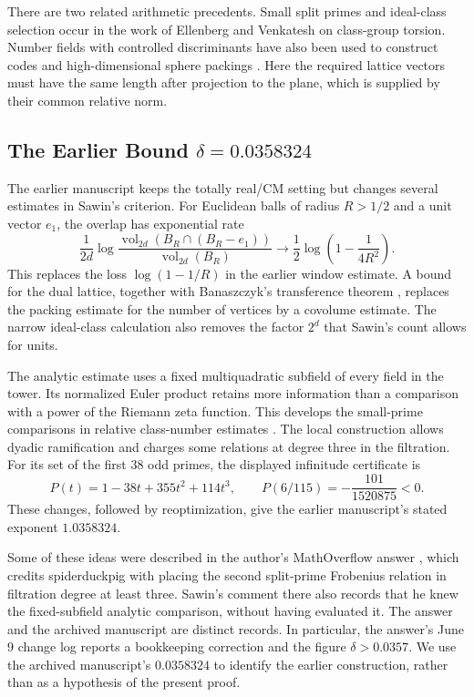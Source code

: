 There are two related arithmetic precedents. Small split primes and
ideal-class selection occur in the work of Ellenberg and Venkatesh
\cite{EllenbergVenkatesh2007} on class-group torsion. Number fields
with controlled discriminants have also been used to construct codes
and high-dimensional sphere packings
\cite{Lenstra1986,LitsynTsfasman1987}. Here the required lattice
vectors must have the same length after projection to the plane,
which is supplied by their common relative norm.

\subsection{The Earlier Bound $\delta=0.0358324$}

The earlier manuscript \cite{NaslundLegacy2026} keeps the totally
real/CM setting but changes several estimates in Sawin's criterion.
For Euclidean balls of radius $R>1/2$ and a unit vector $e_1$, the
overlap has exponential rate
\[
 \frac{1}{2d}\log
 \frac{\operatorname{vol}_{2d}(B_R\cap(B_R-e_1))}
      {\operatorname{vol}_{2d}(B_R)}
 \longrightarrow \frac12\log\left(1-\frac1{4R^2}\right).
\]
This replaces the loss $\log(1-1/R)$ in the earlier window estimate.
A bound for the dual lattice, together with Banaszczyk's transference
theorem \cite{Banaszczyk1993}, replaces the packing estimate for the
number of vertices by a covolume estimate. The narrow ideal-class
calculation also removes the factor $2^d$ that Sawin's count allows
for units.

The analytic estimate uses a fixed multiquadratic subfield of every
field in the tower. Its normalized Euler product retains more
information than a comparison with a power of the Riemann zeta
function. This develops the small-prime comparisons in relative
class-number estimates \cite{Louboutin2000,Louboutin2005}.
The local construction allows dyadic ramification and charges some
relations at degree three in the filtration. For its set of the first
38 odd primes, the displayed infinitude certificate is
\[
 P(t)=1-38t+355t^2+114t^3,\qquad
 P(6/115)=-\frac{101}{1520875}<0.
\]
These changes, followed by reoptimization, give the earlier manuscript's
stated exponent $1.0358324$.

Some of these ideas were described in the author's MathOverflow
answer \cite{NaslundMO2026}, which credits spiderduckpig with placing
the second split-prime Frobenius relation in filtration degree at least
three. Sawin's comment there
also records that he knew the fixed-subfield analytic comparison,
without having evaluated it. The answer and the archived manuscript
are distinct records. In particular, the answer's June 9 change log
reports a bookkeeping correction and the figure $\delta>0.0357$.
We use the archived manuscript's $0.0358324$ to identify the earlier
construction, rather than as a hypothesis of the present proof.

